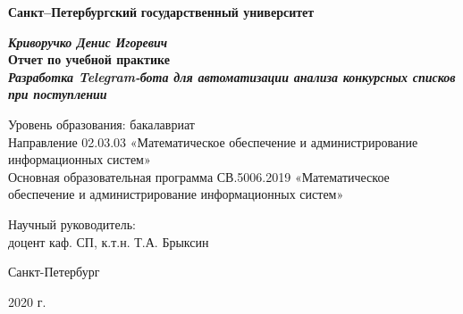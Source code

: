 
\begin{titlepage}
\begin{center}
\textbf{Санкт--Петербургский}
\textbf{государственный университет}

\vspace{35mm}

\textbf{\textit{\large Криворучко Денис Игоревич}} \\[8mm]
\textbf{\large Отчет по учебной практике}\\[3mm]
\textbf{\textit{\large Разработка Telegram-бота для автоматизации анализа конкурсных списков при поступлении}}

\vspace{20mm}
Уровень образования: бакалавриат\\
Направление 02.03.03 «Математическое обеспечение и администрирование информационных систем»\\
Основная образовательная программа СВ.5006.2019
«Математическое обеспечение и администрирование информационных систем»\\[60mm]


\begin{flushright}
{Научный руководитель:} \\
доцент каф. СП, к.т.н. Т.А. Брыксин
\end{flushright}

\vfill 

{Санкт-Петербург}
\par{2020 г.}
\end{center}
\end{titlepage}
\restoregeometry
\addtocounter{page}{1}